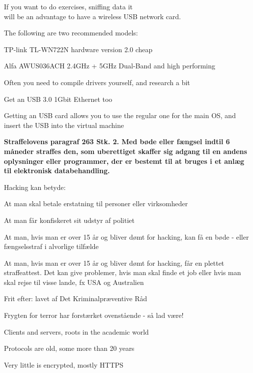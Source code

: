 \documentclass[Screen16to9,17pt]{foils}
\begin{document}

If you want to do exercises, sniffing data it \\
will be an advantage to have a wireless USB network card.
\begin{list2}
\item The following are two recommended models:
\item TP-link TL-WN722N hardware version 2.0 cheap
\item Alfa AWUS036ACH 2.4GHz + 5GHz Dual-Band and high performing
\item Often you need to compile drivers yourself, and research a bit
\item Get an USB 3.0 1Gbit Ethernet too
\end{list2}

Getting an USB card allows you to use the regular one for the main OS, and insert the USB into the virtual machine


\vskip 1cm
{\bfseries Straffelovens paragraf 263 Stk. 2. Med bøde eller fængsel
  indtil 6 måneder
straffes den, som uberettiget skaffer sig adgang til en andens
oplysninger eller programmer, der er bestemt til at bruges i et anlæg
til elektronisk databehandling.}

Hacking kan betyde:
\begin{list2}
\item At man skal betale erstatning til personer eller virksomheder
\item At man får konfiskeret sit udstyr af politiet
\item At man, hvis man er over 15 år og bliver dømt for hacking, kan
  få en bøde - eller fængselsstraf i alvorlige tilfælde
\item At man, hvis man er over 15 år og bliver dømt for hacking, får
en plettet straffeattest. Det kan give problemer, hvis man skal finde
et job eller hvis man skal rejse til visse lande, fx USA og
Australien
\item Frit efter:  lavet af Det
  Kriminalpræventive Råd
\item Frygten for terror har forstærket ovenstående - så lad være!
\end{list2}






\begin{list2}
\item Clients and servers, roots in the academic world
\item Protocols are old, some more than 20 years
\item Very little is encrypted, mostly HTTPS
\end{list2}
\end{document}
